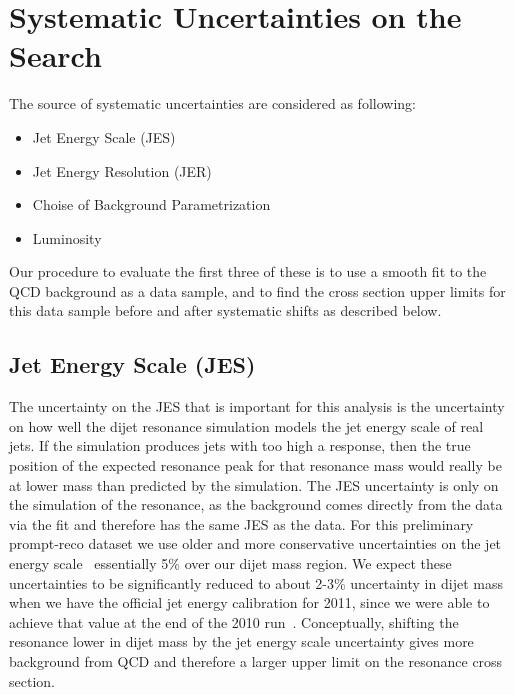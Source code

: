 \section {Systematic Uncertainties on the Search}

The source of systematic uncertainties are considered as following:
\begin{itemize}
\item Jet Energy Scale (JES)
\item Jet Energy Resolution (JER) 
\item Choise of Background Parametrization
\item Luminosity
\end{itemize}
Our procedure to evaluate the first three of these is to use a smooth fit to the 
QCD background as a data sample, and to find the cross section upper limits for 
this data sample before and after systematic shifts as described below. 

\subsection{Jet Energy Scale (JES)} 
The uncertainty on the JES that is important for this analysis
is the uncertainty on how well the dijet resonance simulation models the jet energy scale of real jets.
If the simulation produces jets with too high a response, then the true position of the expected resonance
peak for that resonance mass would really be at lower mass than predicted by the simulation. The JES uncertainty
is only on the simulation of the resonance, as the background 
comes directly from the data via the fit and therefore has the same JES as the data.
For this preliminary prompt-reco dataset we use older and more conservative uncertainties on the 
jet energy scale~\cite{PAS_JME_10-010} essentially 5\% over our dijet mass region.
We expect these uncertainties to be significantly reduced to about 2-3\% uncertainty in dijet 
mass when we have the official jet energy calibration for 2011, since we were able to achieve that value at
the end of the 2010 run~\cite{PAS_JME_10-011}.
Conceptually, shifting the 
resonance lower in dijet mass by the jet energy scale uncertainty 
gives more background from QCD and therefore a larger upper limit on the resonance cross section.


